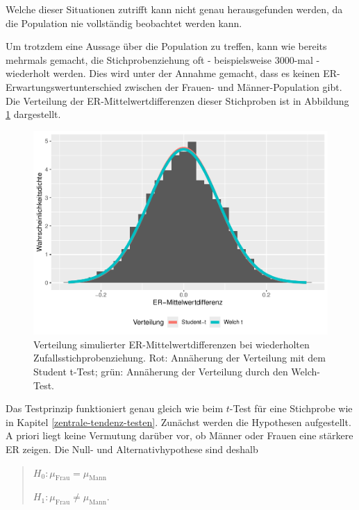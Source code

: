 \documentclass[
]{book}
\theoremstyle{definition}
\theoremstyle{definition}
\theoremstyle{definition}
\theoremstyle{definition}
\theoremstyle{remark}
\begin{document}
Welche dieser Situationen zutrifft kann nicht genau herausgefunden werden, da die Population nie vollständig beobachtet werden kann.

Um trotzdem eine Aussage über die Population zu treffen, kann wie bereits mehrmals gemacht, die Stichprobenziehung oft - beispielsweise \(3000\)-mal - wiederholt werden. Dies wird unter der Annahme gemacht, dass es keinen ER-Erwartungswertunterschied zwischen der Frauen- und Männer-Population gibt. Die Verteilung der ER-Mittelwertdifferenzen dieser Stichproben ist in Abbildung \ref{fig:exm-breakup-hist} dargestellt.

\begin{figure}
\centering
\includegraphics{aps_statistik1_files/figure-latex/exm-breakup-hist-1.pdf}
\caption{\label{fig:exm-breakup-hist}Verteilung simulierter ER-Mittelwertdifferenzen bei wiederholten Zufallsstichprobenziehung. Rot: Annäherung der Verteilung mit dem Student t-Test; grün: Annäherung der Verteilung durch den Welch-Test.}
\end{figure}

Das Testprinzip funktioniert genau gleich wie beim \(t\)-Test für eine Stichprobe wie in Kapitel \ref{zentrale-tendenz-testen}. Zunächst werden die Hypothesen aufgestellt. A priori liegt keine Vermutung darüber vor, ob Männer oder Frauen eine stärkere ER zeigen. Die Null- und Alternativhypothese sind deshalb

\begin{quote}
\(H_0: \mu_\text{Frau} = \mu_\text{Mann}\)

\(H_1: \mu_\text{Frau} \neq \mu_\text{Mann}.\)
\end{quote}
\end{document}
